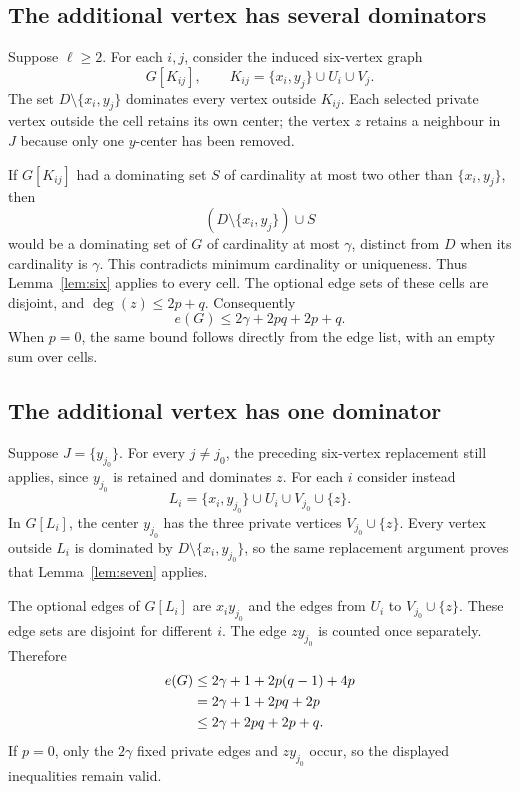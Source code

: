 \documentclass[11pt]{article}
\theoremstyle{definition}
\theoremstyle{remark}
\newcommand{\e}{e}
\begin{document}
\subsection{The additional vertex has several dominators}

Suppose $\ell\ge2$. For each $i,j$, consider the induced six-vertex graph
\[
 G[K_{ij}],\qquad K_{ij}=\{x_i,y_j\}\cup U_i\cup V_j.
\]
The set $D\setminus\{x_i,y_j\}$ dominates every vertex outside $K_{ij}$.
Each selected private vertex outside the cell retains its own center;
the vertex $z$ retains a neighbour in $J$ because only one $y$-center has
been removed.

If $G[K_{ij}]$ had a dominating set $S$ of cardinality at most two other
than $\{x_i,y_j\}$, then
\[
 (D\setminus\{x_i,y_j\})\cup S
\]
would be a dominating set of $G$ of cardinality at most $\gamma$, distinct
from $D$ when its cardinality is $\gamma$. This contradicts minimum
cardinality or uniqueness. Thus Lemma~\ref{lem:six} applies to every cell.
The optional edge sets of these cells are disjoint, and
$\deg(z)\le2p+q$. Consequently
\begin{equation}\label{eq:multiple}
 \e(G)\le 2\gamma+2pq+2p+q.
\end{equation}
When $p=0$, the same bound follows directly from the edge list, with an
empty sum over cells.

\subsection{The additional vertex has one dominator}

Suppose $J=\{y_{j_0}\}$. For every $j\ne j_0$, the preceding six-vertex
replacement still applies, since $y_{j_0}$ is retained and dominates $z$.
For each $i$ consider instead
\[
 L_i=\{x_i,y_{j_0}\}\cup U_i\cup V_{j_0}\cup\{z\}.
\]
In $G[L_i]$, the center $y_{j_0}$ has the three private vertices
$V_{j_0}\cup\{z\}$. Every vertex outside $L_i$ is dominated by
$D\setminus\{x_i,y_{j_0}\}$, so the same replacement argument proves that
Lemma~\ref{lem:seven} applies.

The optional edges of $G[L_i]$ are $x_i y_{j_0}$ and the edges from $U_i$
to $V_{j_0}\cup\{z\}$. These edge sets are disjoint for different $i$.
The edge $zy_{j_0}$ is counted once separately. Therefore
\begin{align}
 \e(G)&\le 2\gamma+1+2p(q-1)+4p\notag\\
       &=2\gamma+1+2pq+2p\notag\\
       &\le2\gamma+2pq+2p+q.\label{eq:single}
\end{align}
If $p=0$, only the $2\gamma$ fixed private edges and $zy_{j_0}$ occur,
so the displayed inequalities remain valid.
\end{document}
